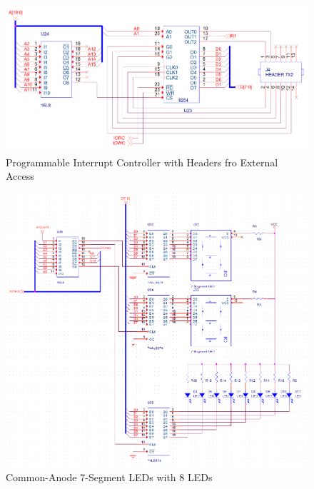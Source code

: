         \begin{figure}[ht]
            \begin{center}
                \includegraphics[width=1\textwidth]{figures/schematics/pit.png}
                \caption{Programmable Interrupt Controller with Headers fro External Access} \label{fig:page9}
            \end{center}
        \end{figure}

        \begin{figure}[ht]
            \begin{center}
                \includegraphics[width=1\textwidth]{figures/schematics/led.png}
                \caption{Common-Anode 7-Segment LEDs with 8 LEDs} \label{fig:page10}
            \end{center}
        \end{figure}

